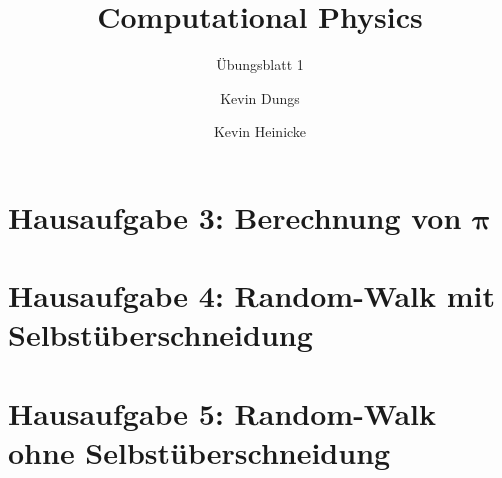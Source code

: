 \documentclass{scrartcl}
\author{Kevin Dungs \and Kevin Heinicke}
\title{Computational Physics}
\subtitle{Übungsblatt 1}
\begin{document}
\maketitle

\section*{Hausaufgabe 3: Berechnung von $\mathbf{\pi}$} 


\section*{Hausaufgabe 4: Random-Walk mit Selbstüberschneidung}


\section*{Hausaufgabe 5: Random-Walk ohne Selbstüberschneidung}
\end{document}
